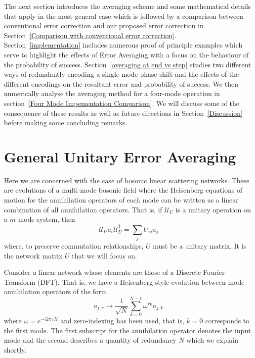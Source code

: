 \documentclass[aps,pra,twocolumn,superscriptaddress,numerical,floatfix]{revtex4-1}
\begin{document}
The next section introduces the averaging scheme and some mathematical details that apply in the most general case which is followed by a comparison between conventional error correction and our proposed error correction in Section~\ref{Comparison with conventional error correction}. Section~\ref{implementation} includes numerous proof of principle examples which serve to highlight the effects of Error Averaging with a focus on the behaviour of the probability of success. Section~\ref{averaging at end vs step} studies two different ways of redundantly encoding a single mode phase shift and the effects of the different encodings on the resultant error and probability of success.  We then numerically analyse the averaging method for a four-mode operation in section~\ref{Four Mode Impementation Comparison}.  We will discuss some of the consequence of these results as well as future directions in Section~\ref{Discussion} before making some concluding remarks. 

\section{General Unitary Error Averaging\label{gen case}}

Here we are concerned with the case of bosonic linear scattering networks.  These are evolutions of a multi-mode bosonic field where the Heisenberg equations of motion for the annihilation operators of each mode can be written as a linear combination of all annihilation operators.  That is, if $\mathcal{U}_U$ is a unitary operation on a $m$ mode system, then
\begin{equation}
	\mathcal{U}_U a_i \mathcal{U}_U^\dagger = \sum_j U_{ij} a_j
\end{equation}
where, to preserve commutation relationships, $U$ must be a unitary matrix.  It is the network matrix $U$ that we will focus on.

Consider a linear network whose elements are those of a Discrete Fourier Transform (DFT).  That is, we have a Heisenberg style evolution between mode annihilation operators of the form
\begin{equation}
	a_{j,r} \rightarrow \frac{1}{\sqrt{N}} \sum_{k=0}^{N-1} \omega^{rk} a_{j,k}	
\end{equation}
where $\omega = e^{-i2\pi /N}$ and zero-indexing has been used, that is, $k=0$ corresponds to the first mode. The first subscript for the annihilation operator denotes the input mode and the second describes a quantity of redundancy $N$ which we explain shortly. 
\end{document}
